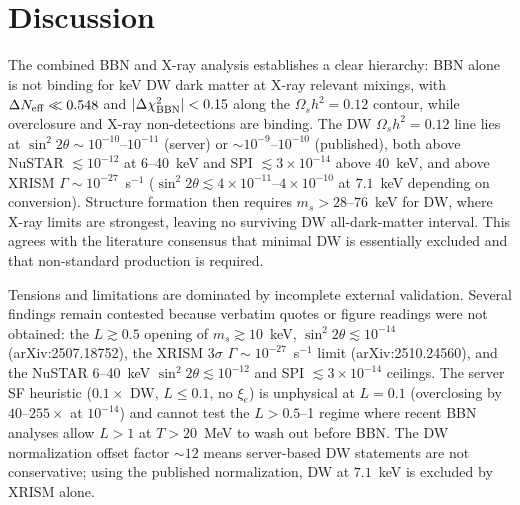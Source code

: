 \documentclass[11pt,a4paper]{article}
\begin{document}
\section{Discussion}
The combined BBN and X-ray analysis establishes a clear hierarchy: BBN alone is not binding for keV DW dark matter at X-ray relevant mixings, with $\Delta N_{\rm eff}\ll0.548$ and $|\Delta\chi^{2}_{\rm BBN}|<0.15$ along the $\Omega_{s}h^{2}=0.12$ contour, while overclosure and X-ray non-detections are binding. The DW $\Omega_{s}h^{2}=0.12$ line lies at $\sin^{2}2\theta\sim10^{-10}$--$10^{-11}$ (server) or $\sim10^{-9}$--$10^{-10}$ (published), both above NuSTAR $\lesssim10^{-12}$ at $6$--40~keV and SPI $\lesssim3\times10^{-14}$ above $40$~keV, and above XRISM $\Gamma\sim10^{-27}$~s$^{-1}$ ($\sin^{2}2\theta\lesssim4\times10^{-11}$--$4\times10^{-10}$ at $7.1$~keV depending on conversion). Structure formation then requires $m_{s}>28$--$76$~keV for DW, where X-ray limits are strongest, leaving no surviving DW all-dark-matter interval. This agrees with the literature consensus that minimal DW is essentially excluded and that non-standard production is required.

Tensions and limitations are dominated by incomplete external validation. Several findings remain contested because verbatim quotes or figure readings were not obtained: the $L\gtrsim0.5$ opening of $m_{s}\gtrsim10$~keV, $\sin^{2}2\theta\lesssim10^{-14}$ (arXiv:2507.18752), the XRISM $3\sigma$ $\Gamma\sim10^{-27}$~s$^{-1}$ limit (arXiv:2510.24560), and the NuSTAR $6$--40~keV $\sin^{2}2\theta\lesssim10^{-12}$ and SPI $\lesssim3\times10^{-14}$ ceilings. The server SF heuristic ($0.1\times$ DW, $L\le0.1$, no $\xi_{e}$) is unphysical at $L=0.1$ (overclosing by $40$--$255\times$ at $10^{-14}$) and cannot test the $L>0.5$--1 regime where recent BBN analyses allow $L>1$ at $T>20$~MeV to wash out before BBN. The DW normalization offset factor $\sim12$ means server-based DW statements are not conservative; using the published normalization, DW at $7.1$~keV is excluded by XRISM alone.
\end{document}
